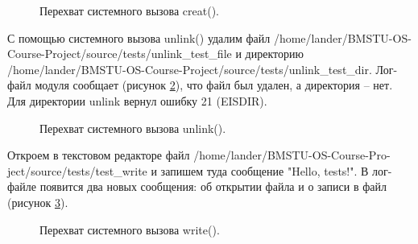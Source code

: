 \documentclass[a4paper,14pt]{article}
\begin{document}
\begin{figure}[!h]
    \caption{Перехват системного вызова creat().}
    \label{fig:creat_test}
\end{figure}

С помощью системного вызова unlink() удалим файл /home/lander/BMSTU-OS-Course-Project/source/tests/unlink\_test\_file и директорию /home/lander/BMSTU-OS-Course-Project/source/tests/unlink\_test\_dir. Лог-файл модуля сообщает (рисунок \ref{fig:unlink_test}), что файл был удален, а директория -- нет. Для директории unlink вернул ошибку 21 (EISDIR).

\begin{figure}[!h]
    \caption{Перехват системного вызова unlink().}
    \label{fig:unlink_test}
\end{figure}

Откроем в текстовом редакторе файл 
/home/lander/BMSTU-OS-Course-Pro-ject/source/tests/test\_write и запишем туда сообщение "Hello, tests!". В лог-файле появится два новых сообщения: об открытии файла и о записи в файл (рисунок \ref{fig:write_test}).

\begin{figure}[!h]
    \caption{Перехват системного вызова write().}
    \label{fig:write_test}
\end{figure}
\end{document}
